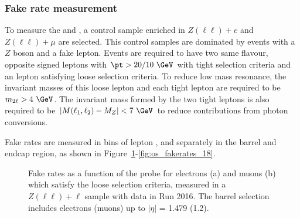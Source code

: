 \subsubsection{Fake rate measurement}

To measure the \frEl and \frMu, a control sample enriched in $Z(\ell\ell)+e$ and $Z(\ell\ell)+\mu$ are selected. This control 
samples are dominated by events with a $Z$ boson and a fake lepton. Events are required to have two same flavour, 
opposite signed leptons with $\pt > 20/10~\GeV$ with tight selection criteria and an lepton satisfying 
loose selection criteria. To reduce low mass resonance, the invariant masses of this loose lepton and each tight lepton 
are required to be $m_{2\ell} > 4~\GeV$. The invariant mass formed by the two tight leptons is also required to be 
$|M(\ell_{1},\ell_{2}) - M_{Z}| < 7~\GeV$ to reduce contributions from photon conversions.

Fake rates are measured in bins of lepton \pt, and separately in the barrel and endcap region, as shown in Figure~\ref{fig:os_fakerates_16}-\ref{fig:os_fakerates_18}.
\begin{figure}[!htb]
\begin{center}
  \caption{
Fake rates as a function of the probe \pt for  electrons (a) and muons (b) which satisfy the loose selection criteria, measured in
a $Z(\ell\ell)+\ell$ sample with data in Run 2016.
The barrel selection includes electrons (muons) up to $|\eta|$ = 1.479 (1.2).
}
\label{fig:os_fakerates_16}
\end{center}
\end{figure}

